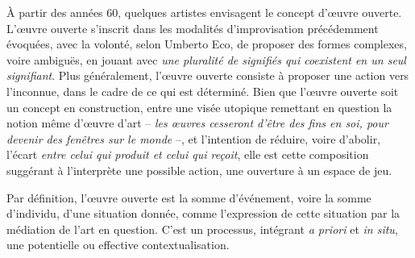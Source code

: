 \documentclass{article}
\begin{document}
À partir des années 60, quelques artistes envisagent le concept d'œuvre ouverte. L'œuvre ouverte s'inscrit dans les modalités d'improvisation précédemment évoquées, avec la volonté, selon Umberto Eco, de proposer des formes complexes, voire ambiguës, en jouant avec \textit{une pluralité de signifiés qui coexistent en un seul signifiant}. Plus généralement, l'œuvre ouverte consiste à proposer une action vers l'inconnue, dans le cadre de ce qui est déterminé. Bien que l'œuvre ouverte soit un concept en construction, entre une visée utopique remettant en question la notion même d'œuvre d'art -- \textit{les œuvres cesseront d'être des fins en soi, pour devenir des fenêtres sur le monde} --, et l'intention de réduire, voire d'abolir, l'écart \textit{entre celui qui produit et celui qui reçoit}, elle est cette composition suggérant à l'interprète une possible action, une ouverture à un espace de jeu. 


Par définition, l'œuvre ouverte est la somme d'événement, voire la somme d'individu, d'une situation donnée, comme l'expression de cette situation par la médiation de l'art en question. C'est un processus, intégrant \textit{a priori} et \textit{in situ}, une potentielle ou effective contextualisation.
\end{document}
